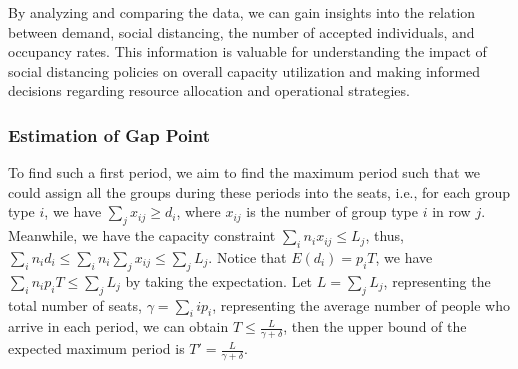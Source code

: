 By analyzing and comparing the data, we can gain insights into the relation between demand, social distancing, the number of accepted individuals, and occupancy rates. This information is valuable for understanding the impact of social distancing policies on overall capacity utilization and making informed decisions regarding resource allocation and operational strategies.

\subsubsection{Estimation of Gap Point}





To find such a first period, we aim to find the maximum period such that we could assign all the groups during these periods into the seats, i.e., for each group type $i$, we have $\sum_{j} x_{ij} \geq d_i$, where $x_{ij}$ is the number of group type $i$ in row $j$. Meanwhile, we have the capacity constraint $\sum_{i} n_{i} x_{ij} \leq L_j$, thus, $\sum_{i} n_i d_i \leq \sum_{i} n_i \sum_{j} x_{ij} \leq \sum_{j} L_{j}$. Notice that $E(d_i) = p_i T$, we have $\sum_{i} n_i p_i T \leq \sum_{j} L_{j}$ by taking the expectation. Let $L = \sum_{j} L_{j}$, representing the total number of seats, $\gamma = \sum_{i} i p_i$, representing the average number of people who arrive in each period, we can obtain $T \leq \frac{L}{\gamma + \delta}$, then the upper bound of the expected maximum period is $T' = \frac{L}{\gamma + \delta}$.

